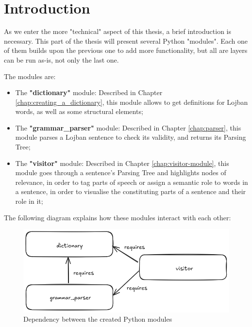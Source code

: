 \chapter{Introduction}

\vspace{0.5cm}

As we enter the more "technical" aspect of this thesis, a brief introduction is necessary. This part of the thesis
will present several Python "modules". Each one of them builds upon the previous one to
add more functionality, but all are layers can be run as-is, not only the last one.\newline

The modules are:

\begin{itemize}
\item The \textbf{"dictionary"} module: Described in Chapter \ref{chap:creating_a_dictionary},
this module allows to get definitions for Lojban words, as well as some structural elements;
\item The \textbf{"grammar\_parser"} module: Described in Chapter \ref{chap:parser}, this module parses
a Lojban sentence to check its validity, and returns its Parsing Tree;
\item The \textbf{"visitor"} module: Described in Chapter \ref{chap:visitor-module}, this module goes through
a sentence's Parsing Tree and highlights nodes of relevance, in order to tag parts of speech or assign a semantic role
to words in a sentence, in order to visualise the constituting parts of a sentence and their role in it;
\end{itemize}

The following diagram explains how these modules interact with each other:\newline

\begin{figure}[H]
\centering
\includegraphics[scale=0.43]{images/module_dependency.png}
\caption{Dependency between the created Python modules}
\end{figure}

